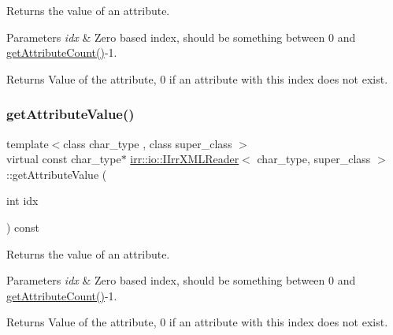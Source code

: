 Returns the value of an attribute. 


\begin{DoxyParams}{Parameters}
{\em idx} & Zero based index, should be something between 0 and \hyperlink{classirr_1_1io_1_1IIrrXMLReader_a8f85253d2efb15061facdb9571b9c549}{get\+Attribute\+Count()}-\/1. \\
\hline
\end{DoxyParams}
\begin{DoxyReturn}{Returns}
Value of the attribute, 0 if an attribute with this index does not exist. 
\end{DoxyReturn}
\mbox{\label{classirr_1_1io_1_1IIrrXMLReader_a41bd71a1b9d4a80cd1d0257dedb35325}} 
\subsubsection{\texorpdfstring{get\+Attribute\+Value()}{getAttributeValue()}\hspace{0.1cm}{\footnotesize\ttfamily [2/4]}}
{\footnotesize\ttfamily template$<$class char\+\_\+type , class super\+\_\+class $>$ \\
virtual const char\+\_\+type$\ast$ \hyperlink{classirr_1_1io_1_1IIrrXMLReader}{irr\+::io\+::\+I\+Irr\+X\+M\+L\+Reader}$<$ char\+\_\+type, super\+\_\+class $>$\+::get\+Attribute\+Value (\begin{DoxyParamCaption}\item[{int}]{idx }\end{DoxyParamCaption}) const\hspace{0.3cm}{\ttfamily [pure virtual]}}



Returns the value of an attribute. 


\begin{DoxyParams}{Parameters}
{\em idx} & Zero based index, should be something between 0 and \hyperlink{classirr_1_1io_1_1IIrrXMLReader_a8f85253d2efb15061facdb9571b9c549}{get\+Attribute\+Count()}-\/1. \\
\hline
\end{DoxyParams}
\begin{DoxyReturn}{Returns}
Value of the attribute, 0 if an attribute with this index does not exist. 
\end{DoxyReturn}
\mbox{\label{classirr_1_1io_1_1IIrrXMLReader_adaac9a49b396e7fc2d335335f36391a9}} 
